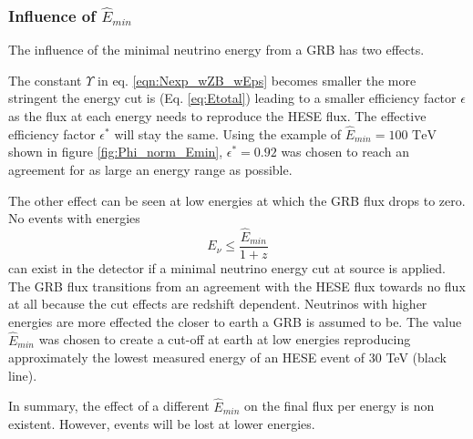 \subsubsection{Influence of $\hat{E}_{min}$}
The influence of the minimal neutrino energy from a GRB has two effects.

The constant $\Upsilon$ in eq. \ref{eqn:Nexp_wZB_wEps} becomes smaller the more
stringent the energy cut is (Eq. \ref{eq:Etotal}) leading to a smaller
efficiency factor $\epsilon$ as the flux at each energy needs to
reproduce the HESE flux. The effective efficiency factor $\epsilon^*$ will stay
the same.
Using the example of $\hat{E}_{min} = 100 \text{ TeV}$ shown in figure
\ref{fig:Phi_norm_Emin}, $\epsilon^*=0.92$ was chosen to reach an agreement
for as large an energy range as possible.  


The other effect can be seen at low energies at which the GRB flux drops to
zero. No events with energies
\begin{equation}
 E_\nu \leq \frac{\hat{E}_{min}}{1+z}
\end{equation}
can exist in the detector if a minimal neutrino energy cut at source is
applied. The GRB flux transitions from an agreement with the HESE flux towards
no flux at all because the cut effects are redshift dependent. Neutrinos 
with higher
energies are more effected the  closer to earth a GRB is assumed to be.
The value $\hat{E}_{min}$ was 
chosen to create a cut-off at earth at low energies reproducing approximately 
the lowest measured energy of an HESE event of 30 TeV (black line).

In summary, the effect of a different $\hat{E}_{min}$ on the final flux per
energy is non existent. However, events will be lost at lower energies. 


